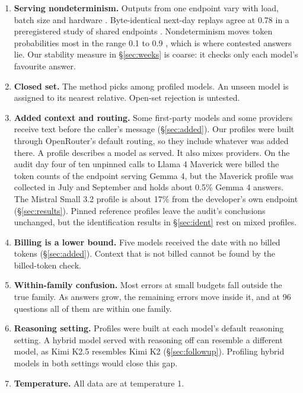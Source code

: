\documentclass[11pt]{article}
\begin{document}
\begin{enumerate}\setlength{\itemsep}{2pt}
\item \textbf{Serving nondeterminism.} Outputs from one endpoint vary with load, batch size and
hardware \citep{he2025nondeterminism}. Byte-identical next-day replays agree at 0.78 in a
preregistered study of shared endpoints \citep{zhu2026unstable}. Nondeterminism moves token
probabilities most in the range 0.1 to 0.9 \citep{fu2026nondeterminism}, which is where contested
answers lie. Our stability measure in \S\ref{sec:weeks} is coarse: it checks only each model's
favourite answer.
\item \textbf{Closed set.} The method picks among profiled models. An unseen model is assigned to
its nearest relative. Open-set rejection is untested.
\item \textbf{Added context and routing.} Some first-party models and some providers receive text
before the caller's message (\S\ref{sec:added}). Our profiles were built through OpenRouter's
default routing, so they include whatever was added there. A profile describes a model as served.
It also mixes providers. On the audit day four of ten unpinned calls to Llama 4 Maverick were
billed the token counts of the endpoint serving Gemma 4, but the Maverick profile was collected in July and September and
holds about 0.5\% Gemma 4 answers. The Mistral Small 3.2 profile is about 17\% from the developer's
own endpoint (\S\ref{sec:results}). Pinned reference profiles leave the audit's conclusions
unchanged, but the identification results in \S\ref{sec:ident} rest on mixed profiles.
\item \textbf{Billing is a lower bound.} Five models received the date with no billed tokens
(\S\ref{sec:added}). Context that is not billed cannot be found by the billed-token check.
\item \textbf{Within-family confusion.} Most errors at small budgets fall outside the true family.
As answers grow, the remaining errors move inside it, and at 96 questions all of them are within
one family.
\item \textbf{Reasoning setting.} Profiles were built at each model's default reasoning setting. A
hybrid model served with reasoning off can resemble a different model, as Kimi K2.5 resembles
Kimi K2 (\S\ref{sec:followup}). Profiling hybrid models in both settings would close this gap.
\item \textbf{Temperature.} All data are at temperature 1.

\end{enumerate}
\end{document}
